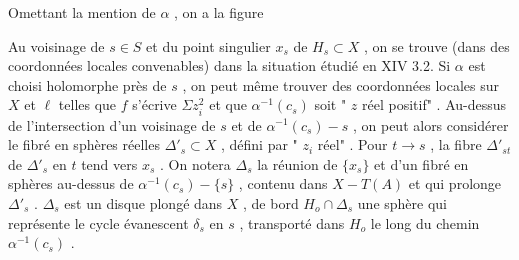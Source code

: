 Omettant la mention de $\alpha$ , on a la figure

\begin{center}
\end{center}
Au voisinage de $s \in S$ et du point singulier $x_s$ de $H_s \subset X$ , on se trouve (dans des coordonnées locales convenables) dans la situation étudié en XIV 3.2. Si $\alpha$ est choisi holomorphe près de $s$ , on peut même trouver des coordonnées locales sur $X$ et $\ell$ telles que $f$ s'écrive $\Sigma z_i^2$ et que $\alpha^{-1}(c_s)$ soit " $z$ réel positif" . Au-dessus de l'intersection d'un voisinage de $s$ et de $\alpha^{-1}(c_s) - s$ , on peut alors considérer le fibré en sphères réelles $\Delta'_s \subset X$ , défini par " $z_i$ réel" . Pour $t \to s$ , la fibre $\Delta'_{st}$ de $\Delta'_s$ en $t$ tend vers $x_s$ . On notera $\Delta_s$ la réunion de $\{x_s\}$ et d'un fibré en sphères au-dessus de $\alpha^{-1}(c_s) - \{s\}$ , contenu dans $X - T(A)$ et qui prolonge $\Delta'_s$ . $\Delta_s$ est un disque plongé dans $X$ , de bord $H_o \cap \Delta_s$ une sphère qui représente le cycle évanescent $\delta_s$ en $s$ , transporté dans $H_o$ le long du chemin $\alpha^{-1}(c_s)$ .

